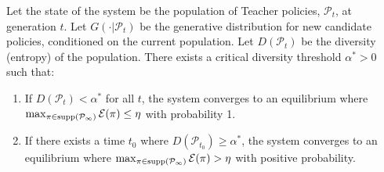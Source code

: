 \begin{theorem}
\label{thm:threshold}
Let the state of the system be the population of Teacher policies, $\mathcal{P}_t$, at generation $t$. Let $G(\cdot | \mathcal{P}_t)$ be the generative distribution for new candidate policies, conditioned on the current population. Let $D(\mathcal{P}_t)$ be the diversity (entropy) of the population. There exists a critical diversity threshold $\alpha^* > 0$ such that:
\begin{enumerate}
    \item If $D(\mathcal{P}_t) < \alpha^*$ for all $t$, the system converges to an equilibrium where $\max_{\pi \in \text{supp}(\mathcal{P}_{\infty})} \mathcal{E}(\pi) \le \eta$ with probability 1.
    \item If there exists a time $t_0$ where $D(\mathcal{P}_{t_0}) \ge \alpha^*$, the system converges to an equilibrium where $\max_{\pi \in \text{supp}(\mathcal{P}_{\infty})} \mathcal{E}(\pi) > \eta$ with positive probability.
\end{enumerate}
\end{theorem}

